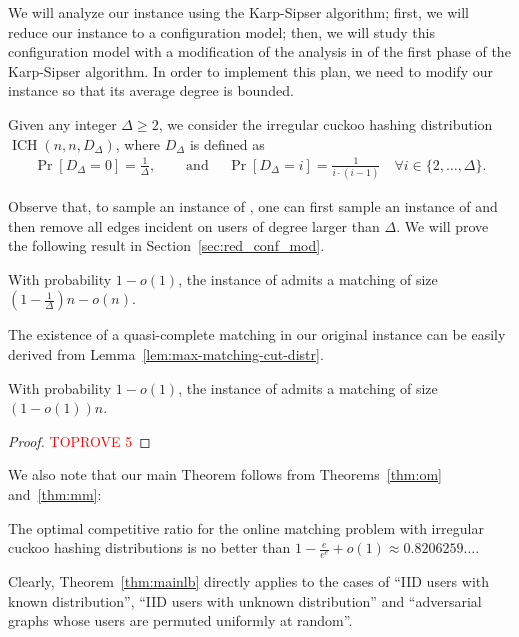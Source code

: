 \documentclass[11pt]{article}
\DeclareMathOperator*{\irregularcuckoohashing}{ICH}
\begin{document}
We will analyze our instance using the Karp-Sipser algorithm; first, we will reduce our instance to a configuration model; then, we will study this configuration model with a modification of the analysis in \cite{bg15} of the first phase of the Karp-Sipser algorithm. In order to implement this plan, we need to modify our instance so that its average degree is bounded.
\begin{definition}\label{def:modified-instance}
Given any integer $\Delta \geq 2$, we consider the irregular cuckoo hashing distribution $\irregularcuckoohashing(n, n, D_{\Delta})$, where $D_\Delta$ is defined as
\begin{align*}
\Pr[D_\Delta = 0]  = \frac{1}{\Delta}, &\quad \text{ and } \quad
\Pr[D_\Delta = i]  = \frac{1}{i\cdot(i-1)} \quad \forall i \in \{2,\dots, \Delta\}.
\end{align*}
\end{definition}
Observe that, to sample an instance of , one can first sample an instance of  and then remove all edges incident on users of degree larger than $\Delta$. We will prove the following result in Section~\ref{sec:red_conf_mod}.
\begin{lemma}\label{lem:max-matching-cut-distr}
With probability $1-o(1)$, the instance of  admits a matching of size $\left(1 - \frac{1}{\Delta}\right)n - o(n)$.
\end{lemma}
The existence of a quasi-complete matching in our original instance can be easily derived from Lemma~\ref{lem:max-matching-cut-distr}. \begin{theoremrep}\label{thm:mm}
With probability $1-o(1)$, the instance of  admits a matching of size $(1-o(1))n$.
\end{theoremrep}
\begin{proof}\textcolor{red}{TOPROVE 5}\end{proof}
We also note that our main Theorem follows from Theorems~\ref{thm:om} and~\ref{thm:mm}:
\begin{theorem}\label{thm:mainlb}
The optimal competitive ratio for the online matching problem with irregular cuckoo hashing  distributions is no better than $1 - \frac e{e^e} + o(1) \approx 0.8206259\ldots$.
\end{theorem}
Clearly, Theorem~\ref{thm:mainlb} directly applies to the cases of ``IID users with known distribution'', ``IID users with unknown distribution'' and ``adversarial graphs whose users are permuted uniformly at random''.
\end{document}

